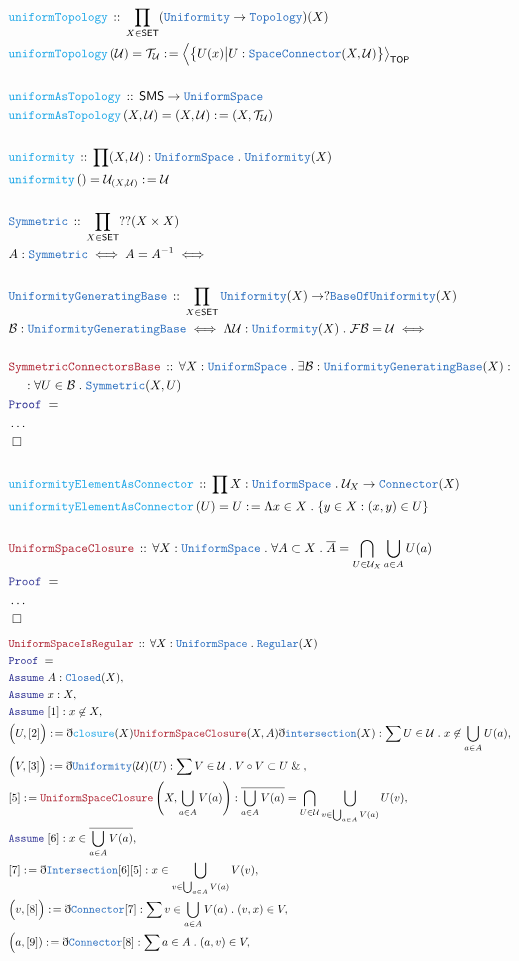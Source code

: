 \documentclass[12pt]{scrartcl}
\newcommand{\TYPE}[1]{\textcolor{NavyBlue}{\mathtt{#1}}}
\newcommand{\FUNC}[1]{\textcolor{Cerulean}{\mathtt{#1}}}
\newcommand{\LOGIC}[1]{\textcolor{Blue}{\mathtt{#1}}}
\newcommand{\THM}[1]{\textcolor{Maroon}{\mathtt{#1}}}
\renewcommand{\.}{\; . \;}
\newcommand{\de}{: \kern 0.1pc =}
\newcommand{\Act}[1]{\left( #1 \right)}
\newcommand{\Theorem}[2]{& \THM{#1} \, :: \, #2 \\ & \Proof = \\ }
\newcommand{\DeclareType}[2]{& \TYPE{#1} \, :: \, #2 \\}
\newcommand{\DefineNamedType}[4]{& #1 : \TYPE{#2} \iff #3 \iff #4 \\}
\newcommand{\DeclareFunc}[2]{& \FUNC{#1} \, :: \, #2 \\}
\newcommand{\DefineNamedFunc}[4]{&  \FUNC{#1}\Act{#2} = #3 \de #4 \\}
\newcommand{\NewLine}{\\ & \kern 1pc}
\newcommand{\Page}[1]{ \begin{align*} #1 \end{align*}   }
\newcommand{ \bd }{ \ByDef }
\newcommand{\NoProof}{ & \ldots \\ \EndProof}
\renewcommand{\And}{\; \& \;}
\newcommand{\Say}[3]{& #1 \de #2 : #3, \\}
\newcommand{\Assume}[2]{& \LOGIC{Assume} \; #1 : #2, \\}
\newcommand{\QED}{\; \square}
\newcommand{\EndProof}{& \QED \\}
\newcommand{\ByDef}{\eth}
\newcommand{\Proof}{\LOGIC{Proof} \; }
\newcommand{\B}{\mathcal{B}}
\newcommand{\SET}{\mathsf{SET}}
\newcommand{\TOP}{\mathsf{TOP}}
\newcommand{\T}{\mathcal{T}}
\newcommand{\U}{\mathcal{U}}
\newcommand{\F}{\mathcal{F}}
\newcommand{\SMS}{\mathsf{SMS}}
\begin{document}
{}\Page{
	\DeclareFunc{uniformTopology}{\prod_{X \in \SET}(\TYPE{Uniformity} \to \TYPE{Topology})(X)}
	\DefineNamedFunc{uniformTopology}{\U}{\T_\U}{\Big\langle \big\{  U(x) \big| U : \TYPE{SpaceConnector}(X,\U)    \big\} \big\rangle_{\TOP}}
	\\
	\DeclareFunc{uniformAsTopology}{\SMS \to \TYPE{UniformSpace}}
	\DefineNamedFunc{uniformAsTopology}{X,\U}{(X,\U)}{ (X,\T_\U)}
	\\
	\DeclareFunc{uniformity}{\prod (X,\U) : \TYPE{UniformSpace} \. \TYPE{Uniformity}(X)}
	\DefineNamedFunc{uniformity}{}{\U_{(X,\U)}}{\U}
	\\
	\DeclareType{Symmetric}{\prod_{X \in \SET} ??(X \times X)}
	\DefineNamedType{A}{Symmetric}{A = A^{-1}}
	\\
	\DeclareType{UniformityGeneratingBase}{\prod_{X \in \SET} \TYPE{Uniformity}(X) \to ?\TYPE{BaseOfUniformity}(X)}
	\DefineNamedType{\B}{UniformityGeneratingBase}{\Lambda \U : \TYPE{Uniformity}(X) \. \F \B = \U}
	\\
	\Theorem{SymmetricConnectorsBase}{\forall X : \TYPE{UniformSpace} \. \exists \B : \TYPE{UniformityGeneratingBase}(X) : \NewLine : \forall U \in \B \. \TYPE{Symmetric}(X,U)}
	\NoProof
	\\
	\DeclareFunc{uniformityElementAsConnector}{\prod X : \TYPE{UniformSpace} \. \U_X \to \TYPE{Connector}(X)}
	\DefineNamedFunc{uniformityElementAsConnector}{U}{U}{\Lambda x \in X \.   \{  y \in X : (x,y) \in U \}}
	\\
	\Theorem{UniformSpaceClosure}{\forall X : \TYPE{UniformSpace} \. \forall A \subset X \. \overline{A} = \bigcap_{U \in \U_X} \bigcup_{a \in A} U(a)}
	\NoProof
}\Page{
	\Theorem{UniformSpaceIsRegular}{\forall X : \TYPE{UniformSpace} \. \TYPE{Regular}(X)}
	\Assume{A}{\TYPE{Closed}(X)}
	\Assume{x}{X}
	\Assume{[1]}{x \not \in X}
	\Say{\Big( U, [2] \Big)}{\bd \FUNC{closure}(X)\THM{UniformSpaceClosure}(X,A) \bd \TYPE{intersection}(X)}{\sum U \in \U \. x \not \in \bigcup_{a \in A} U(a)}
	\Say{\Big(V,[3]\Big)}{\bd \TYPE{Uniformity}(\U)(U)}{ \sum V \in \U \. V \circ V \subset U \And }
	\Say{[5]}{\THM{UniformSpaceClosure}\left(X, \bigcup_{a \in A} V(a) \right)}{   \overline{\bigcup_{a \in A} V(a)} = \bigcap_{U \in \U} \bigcup_{v \in \bigcup_{a \in A} V(a)}  U(v) }
	\Assume{[6]}{x \in  \overline{\bigcup_{a \in A} V(a)} }
	\Say{[7]}{\bd \TYPE{Intersection}[6][5]}{  x \in \bigcup_{v \in \bigcup_{a \in A} V(a)}  V(v)   }
	\Say{\Big(v,[8]\Big)}{\bd \TYPE{Connector}[7]}{ \sum v \in \bigcup_{a \in A} V(a) \. (v,x) \in  V}
	\Say{\Big(a,[9])}{\bd \TYPE{Connector}[8]}{\sum a \in A \. (a,v) \in V}
}
\end{document}
